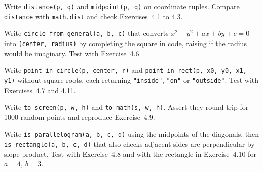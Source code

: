 \begin{codeexercises}
\item Write \lstinline!distance(p, q)! and \lstinline!midpoint(p, q)! on coordinate tuples. Compare \lstinline!distance! with \lstinline!math.dist! and check Exercises~4.1 to 4.3.
\item Write \lstinline!circle_from_general(a, b, c)! that converts $x^2 + y^2 + ax + by + c = 0$ into \lstinline!(center, radius)! by completing the square in code, raising if the radius would be imaginary. Test with Exercise~4.6.
\item Write \lstinline!point_in_circle(p, center, r)! and \lstinline!point_in_rect(p, x0, y0, x1, y1)! without square roots, each returning \lstinline!"inside"!, \lstinline!"on"! or \lstinline!"outside"!. Test with Exercises~4.7 and 4.11.
\item Write \lstinline!to_screen(p, w, h)! and \lstinline!to_math(s, w, h)!. Assert they round-trip for 1000 random points and reproduce Exercise~4.9.
\item Write \lstinline!is_parallelogram(a, b, c, d)! using the midpoints of the diagonals, then \lstinline!is_rectangle(a, b, c, d)! that also checks adjacent sides are perpendicular by slope product. Test with Exercise~4.8 and with the rectangle in Exercise~4.10 for $a = 4$, $b = 3$.
\end{codeexercises}
